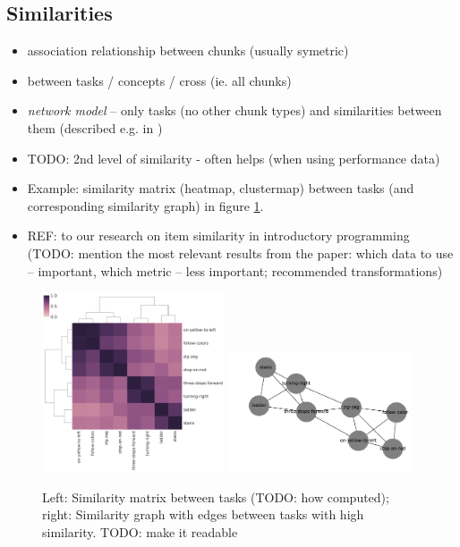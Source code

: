 


\subsection{Similarities}

\begin{itemize}
\item association relationship between chunks (usually symetric)
\item between tasks / concepts / cross (ie. all chunks)
\item \emph{network model} -- only tasks (no other chunk types) and similarities
  between them (described e.g. in \cite{rihak-phd})
\item TODO: 2nd level of similarity - often helps (when using performance data) \cite{rihak-phd}
\item Example: similarity matrix (heatmap, clustermap) between tasks
  (and corresponding similarity graph) in figure \ref{fig:similarities-tasks}.
\item REF: to our research on item similarity in introductory programming
  (TODO: mention the most relevant results from the paper:
   which data to use -- important, which metric -- less important; recommended transformations)
\end{itemize}

\begin{figure}[htb]
\begin{center}
  \includegraphics[width=0.48\textwidth]{img/similarities-tasks}
  \includegraphics[width=0.48\textwidth]{img/similarities-graph}
\end{center}
\caption{%
  Left: Similarity matrix between tasks (TODO: how computed);
  right: Similarity graph with edges between tasks with high similarity.
  TODO: make it readable}
\label{fig:similarities-tasks}
\end{figure}

